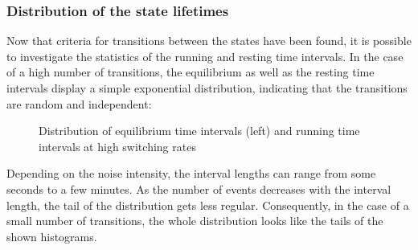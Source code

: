 \documentclass[12pt,a4paper]{article}
\begin{document}
\subsubsection{Distribution of the state lifetimes}
Now that criteria for transitions between the states have been found, it is possible to investigate the statistics of the running and resting time intervals. In the case of a high number of transitions, the equilibrium as well as the resting time intervals display a simple exponential distribution, indicating that the transitions are random and independent:
\begin{figure}[H]
	\hspace*{-0.5cm}
	\caption{Distribution of equilibrium time intervals (left) and running time intervals at high switching rates}
	\label{intdistgood}
\end{figure}
Depending on the noise intensity, the interval lengths can range from some seconds to a few minutes. As the number of events decreases with the interval length, the tail of the distribution gets less regular. Consequently, in the case of a small number of transitions, the whole distribution looks like the tails of the shown histograms.
\end{document}

